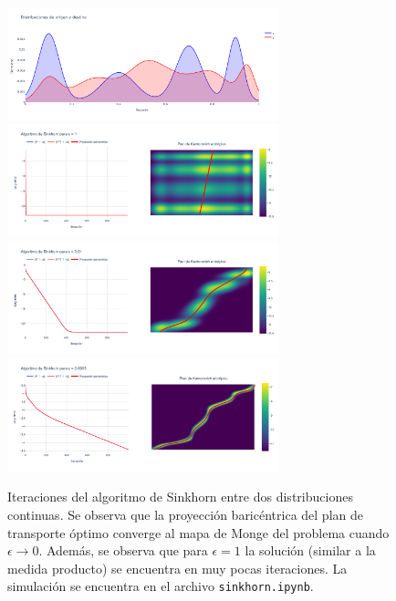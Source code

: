 \begin{figure}[!ht]
	\centering
	\includegraphics[width=0.7\textwidth]{images/eot_sbp/continuous_sinkhorn_density}
	\includegraphics[width=0.7\textwidth]{images/eot_sbp/continuous_sinkhorn_matrix1}
	\includegraphics[width=0.7\textwidth]{images/eot_sbp/continuous_sinkhorn_matrix0.01}
	\includegraphics[width=0.7\textwidth]{images/eot_sbp/continuous_sinkhorn_matrix0.0005}
	\caption{Iteraciones del algoritmo de Sinkhorn entre dos distribuciones continuas. Se observa que la proyección baricéntrica del plan de transporte óptimo converge al mapa de Monge del problema cuando $\epsilon\to0$. Además, se observa que para $\epsilon=1$ la solución (similar a la medida producto) se encuentra en muy pocas iteraciones. La simulación se encuentra en el archivo \texttt{sinkhorn.ipynb}.}
	\label{fig:eot_sbp/discrete_sinkhorn_matrix1}
\end{figure}

